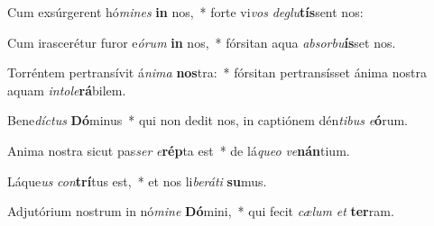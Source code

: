 \item Cum exsúrgerent hó\textit{mi}\textit{nes} \textbf{in} nos,~* forte vi\textit{vos} \textit{de}\textit{glu}\textbf{tís}sent nos:
\item Cum irascerétur furor e\textit{ó}\textit{rum} \textbf{in} nos,~* fórsitan aqua \textit{ab}\textit{sor}\textit{bu}\textbf{ís}set nos.
\item Torréntem pertransívit á\textit{ni}\textit{ma} \textbf{nos}tra:~* fórsitan pertransísset ánima nostra aquam \textit{in}\textit{to}\textit{le}\textbf{rá}bilem.
\item Bene\textit{díc}\textit{tus} \textbf{Dó}minus~* qui non dedit nos, in captiónem dén\textit{ti}\textit{bus} \textit{e}\textbf{ó}rum.
\item Anima nostra sicut pas\textit{ser} \textit{e}\textbf{rép}ta est~* de lá\textit{que}\textit{o} \textit{ve}\textbf{nán}tium.
\item Láque\textit{us} \textit{con}\textbf{trí}tus est,~* et nos li\textit{be}\textit{rá}\textit{ti} \textbf{su}mus.
\item Adjutórium nostrum in nó\textit{mi}\textit{ne} \textbf{Dó}mini,~* qui fecit \textit{cæ}\textit{lum} \textit{et} \textbf{ter}ram.

